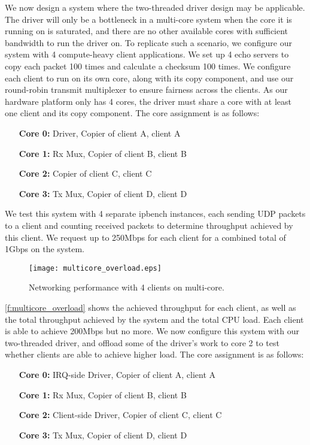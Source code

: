 We now design a system where the two-threaded driver design may be applicable. The driver will only be a bottleneck in a
multi-core system when the core it is running on is saturated, and there are no other available cores with sufficient bandwidth
to run the driver on. To replicate such a scenario, we configure our system with 4 compute-heavy client applications. We set up
4 echo servers to copy each packet 100 times and calculate a checksum 100 times. We configure each client to run on its own
core, along with its copy component, and use our round-robin transmit multiplexer to ensure fairness across the clients. 
As our hardware platform only has 4 cores, the driver must share a core with at least one client and 
its copy component. The core assignment is as follows:
\begin{itemize}
    \item[      \textbf{Core 0:}] Driver, Copier of client A, client A
    \item[      \textbf{Core 1:}] Rx Mux, Copier of client B, client B
    \item[      \textbf{Core 2:}] Copier of client C, client C
    \item[      \textbf{Core 3:}] Tx Mux, Copier of client D, client D
\end{itemize}

We test this system with 4 separate ipbench instances, each sending UDP packets to a client and counting received packets
to determine throughput achieved by this client. We request up to 250Mbps for each client for a combined total of 1Gbps on the system.

\begin{figure}[h]
    \centering
    \texttt{[image: multicore\_overload.eps]}
    \caption{Networking performance with 4 clients on multi-core.}
    \label{f:multicore_overload}
\end{figure}

\autoref{f:multicore_overload} shows the achieved throughput for each client, as well as the total throughput achieved 
by the system and the total CPU load. Each client is able to achieve 200Mbps but no more. We now configure this system 
with our two-threaded driver, and offload some of the driver's work to core 2 to test whether clients are able to 
achieve higher load. The core assignment is as follows:

\begin{itemize}
    \item[      \textbf{Core 0:}] IRQ-side Driver, Copier of client A, client A
    \item[      \textbf{Core 1:}] Rx Mux, Copier of client B, client B
    \item[      \textbf{Core 2:}] Client-side Driver, Copier of client C, client C
    \item[      \textbf{Core 3:}] Tx Mux, Copier of client D, client D
\end{itemize}

